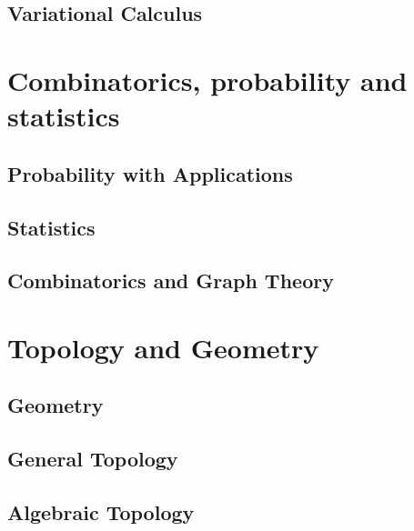 \documentclass[12pt]{report}
\begin{document}
\chapter{Variational Calculus}\label{cha:variational-calculus}


\part{Combinatorics, probability and statistics}

\chapter{Probability with Applications}\label{cha:prob-with-appl}

\chapter{Statistics}\label{cha:statistics}

\chapter{Combinatorics and Graph Theory}\label{cha:comb-graph-theory}


\part{Topology and Geometry}

\chapter{Geometry}\label{cha:geometry}

\chapter{General Topology}\label{cha:general-topology}

\chapter{Algebraic Topology}\label{cha:algebraic-topology}
\end{document}
